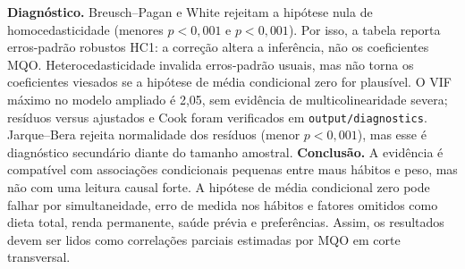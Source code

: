 \documentclass[10pt,a4paper]{article}
\begin{document}
\textbf{Diagnóstico.} Breusch--Pagan e White rejeitam a hipótese nula de homocedasticidade (menores $p<0{,}001$ e $p<0{,}001$). Por isso, a tabela reporta erros-padrão robustos HC1: a correção altera a inferência, não os coeficientes MQO. Heterocedasticidade invalida erros-padrão usuais, mas não torna os coeficientes viesados se a hipótese de média condicional zero for plausível. O VIF máximo no modelo ampliado é 2,05, sem evidência de multicolinearidade severa; resíduos versus ajustados e Cook foram verificados em \texttt{output/diagnostics}. Jarque--Bera rejeita normalidade dos resíduos (menor $p<0{,}001$), mas esse é diagnóstico secundário diante do tamanho amostral.
\textbf{Conclusão.} A evidência é compatível com associações condicionais pequenas entre maus hábitos e peso, mas não com uma leitura causal forte. A hipótese de média condicional zero pode falhar por simultaneidade, erro de medida nos hábitos e fatores omitidos como dieta total, renda permanente, saúde prévia e preferências. Assim, os resultados devem ser lidos como correlações parciais estimadas por MQO em corte transversal.
\end{document}
